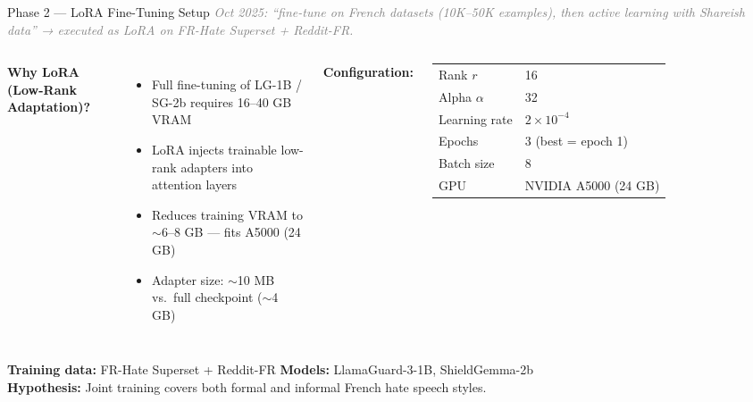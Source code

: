 \documentclass[aspectratio=169, 12pt]{beamer}
\begin{document}
\begin{frame}[shrink=25]{Phase 2 — LoRA Fine-Tuning Setup}
  \textit{\small\textcolor{gray}{Oct 2025: ``fine-tune on French datasets (10K–50K examples), then active learning with Shareish data'' → executed as LoRA on FR-Hate Superset + Reddit-FR.}}\\[4pt]
  \begin{columns}[T]
      \textbf{Why LoRA (Low-Rank Adaptation)?}
      \begin{itemize}
        \item Full fine-tuning of LG-1B / SG-2b requires 16–40 GB VRAM
        \item LoRA injects trainable low-rank adapters into attention layers
        \item Reduces training VRAM to $\sim$6–8 GB — fits A5000 (24 GB)
        \item Adapter size: $\sim$10 MB vs.\ full checkpoint ($\sim$4 GB)
      \end{itemize}

      \textbf{Configuration:}\\[4pt]
      \small
      \begin{tabular}{ll}
        \toprule
        Rank $r$ & 16 \\
        Alpha $\alpha$ & 32 \\
        Learning rate & $2 \times 10^{-4}$ \\
        Epochs & 3 (best = epoch 1) \\
        Batch size & 8 \\
        GPU & NVIDIA A5000 (24 GB) \\
        \bottomrule
      \end{tabular}
  \end{columns}
  \vspace{6pt}
  \textbf{Training data:} FR-Hate Superset + Reddit-FR \quad
  \textbf{Models:} LlamaGuard-3-1B, ShieldGemma-2b\\
  \textbf{Hypothesis:} Joint training covers both formal and informal French hate speech styles.
\end{frame}
\end{document}
